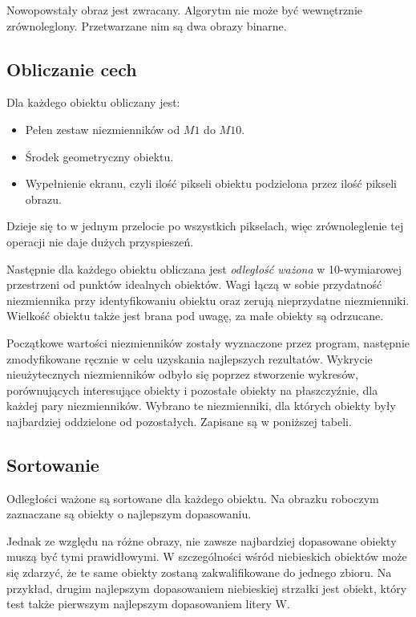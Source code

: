 \documentclass[a4paper,12pt]{article}
\begin{document}
			Nowopowstały obraz jest zwracany.
			Algorytm nie może być wewnętrznie zrównoleglony.
			Przetwarzane nim są dwa obrazy binarne.
			
		\subsection{Obliczanie cech}
			Dla każdego obiektu obliczany jest:
			\begin{itemize}
				\item Pełen zestaw niezmienników od $M1$ do $M10$.
				\item Środek geometryczny obiektu.
				\item Wypełnienie ekranu, czyli ilość pikseli obiektu podzielona przez ilość pikseli obrazu.
			\end{itemize}
			
			Dzieje się to w jednym przelocie po wszystkich pikselach, więc zrównoleglenie tej operacji nie daje dużych przyspieszeń.
			
			Następnie dla każdego obiektu obliczana jest \emph{odległość ważona} w 10-wymiarowej przestrzeni od punktów idealnych obiektów.
			Wagi łączą w sobie przydatność niezmiennika przy identyfikowaniu obiektu oraz zerują nieprzydatne niezmienniki.
			Wielkość obiektu także jest brana pod uwagę, za małe obiekty są odrzucane.
			
			Początkowe wartości niezmienników zostały wyznaczone przez program, następnie zmodyfikowane ręcznie w celu uzyskania najlepszych rezultatów.
			Wykrycie nieużytecznych niezmienników odbyło się poprzez stworzenie wykresów, porównujących interesujące obiekty i pozostałe obiekty na płaszczyźnie, dla każdej pary niezmienników. Wybrano te niezmienniki, dla których obiekty były najbardziej oddzielone od pozostałych.
			Zapisane są w poniższej tabeli.
			
			\begin{center}
				\invarianttable{}
			\end{center}

		\subsection{Sortowanie}
			Odległości ważone są sortowane dla każdego obiektu.
			Na obrazku roboczym zaznaczane są obiekty o najlepszym dopasowaniu.
			
			Jednak ze względu na różne obrazy, nie zawsze najbardziej dopasowane obiekty muszą być tymi prawidłowymi.
			W szczególności wśród niebieskich obiektów może się zdarzyć, że te same obiekty zostaną zakwalifikowane do jednego zbioru.
			Na przykład, drugim najlepszym dopasowaniem niebieskiej strzałki jest obiekt, który test także pierwszym najlepszym dopasowaniem litery W.
			
\end{document}
